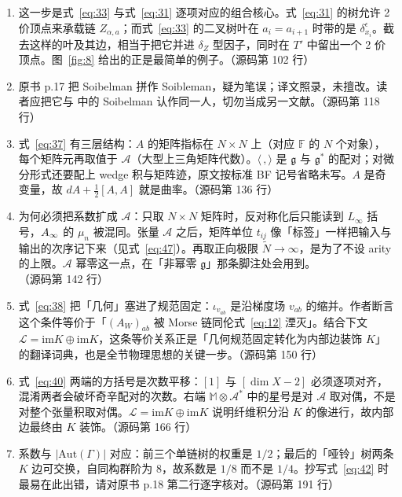 \begin{enumerate}
  \item 这一步是式~\eqref{eq:33} 与式~\eqref{eq:31} 逐项对应的组合核心。式~\eqref{eq:31} 的树允许 2 价顶点来承载链 $Z_{\alpha,a}$；而式~\eqref{eq:33} 的二叉树叶在 $a_i=a_{i+1}$ 时带的是 $\delta^{\epsilon}_{x_i}$。截去这样的叶及其边，相当于把它并进 $\delta_{Z}$ 型因子，同时在 $T'$ 中留出一个 2 价顶点。图~\ref{fig:8} 给出的正是最简单的例子。\hfill{\footnotesize （源码第 102 行）}
  \item 原书 p.17 把 Soibelman 拼作 Soibleman，疑为笔误；译文照录，未擅改。读者应把它与 \cite{kontsevichsoibelman} 中的 Soibelman 认作同一人，切勿当成另一文献。\hfill{\footnotesize （源码第 118 行）}
  \item 式~\eqref{eq:37} 有三层结构：$A$ 的矩阵指标在 $N\times N$ 上（对应 $\mathbb{F}$ 的 $N$ 个对象），每个矩阵元再取值于 $\mathcal A$（大型上三角矩阵代数）。$\langle\,,\rangle$ 是 $\mathfrak g$ 与 $\mathfrak g^*$ 的配对；对微分形式还要配上 wedge 积与矩阵迹，原文按标准 BF 记号省略未写。$A$ 是奇变量，故 $dA+\frac12[A,A]$ 就是曲率。\hfill{\footnotesize （源码第 136 行）}
  \item 为何必须把系数扩成 $\mathcal A$：只取 $N\times N$ 矩阵时，反对称化后只能读到 $L_\infty$ 括号，$A_\infty$ 的 $\mu_n$ 被混同。张量 $\mathcal A$ 之后，矩阵单位 $t_{ij}$ 像「标签」一样把输入与输出的次序记下来（见式~\eqref{eq:47}）。再取正向极限 $\widetilde N\to\infty$，是为了不设 arity 的上限。$\mathcal A$ 幂零这一点，在「非幂零 $\mathfrak g$」那条脚注处会用到。\hfill{\footnotesize （源码第 142 行）}
  \item 式~\eqref{eq:38} 把「几何」塞进了规范固定：$\iota_{v_{ab}}$ 是沿梯度场 $v_{ab}$ 的缩并。作者断言这个条件等价于「$(A_W)_{ab}$ 被 Morse 链同伦式~\eqref{eq:12} 湮灭」。结合下文 $\mathcal L=\mathrm{im}K\oplus\mathrm{im}K$，这条等价关系正是「几何规范固定转化为内部边装饰 $K$」的翻译词典，也是全节物理思想的关键一步。\hfill{\footnotesize （源码第 150 行）}
  \item 式~\eqref{eq:40} 两端的方括号是次数平移：$[1]$ 与 $[\dim X-2]$ 必须逐项对齐，混淆两者会破坏奇辛配对的次数。右端 $\mathbb{M}\otimes\mathcal A^*$ 中的星号是对 $\mathcal A$ 取对偶，不是对整个张量积取对偶。$\mathcal L=\mathrm{im}K\oplus\mathrm{im}K$ 说明纤维积分沿 $K$ 的像进行，故内部边最终由 $K$ 装饰。\hfill{\footnotesize （源码第 166 行）}
  \item 系数与 $|\mathrm{Aut}(\Gamma)|$ 对应：前三个单链树的权重是 $1/2$；最后的「哑铃」树两条 $K$ 边可交换，自同构群阶为 $8$，故系数是 $1/8$ 而不是 $1/4$。抄写式~\eqref{eq:42} 时最易在此出错，请对原书 p.18 第二行逐字核对。\hfill{\footnotesize （源码第 191 行）}

\end{enumerate}
